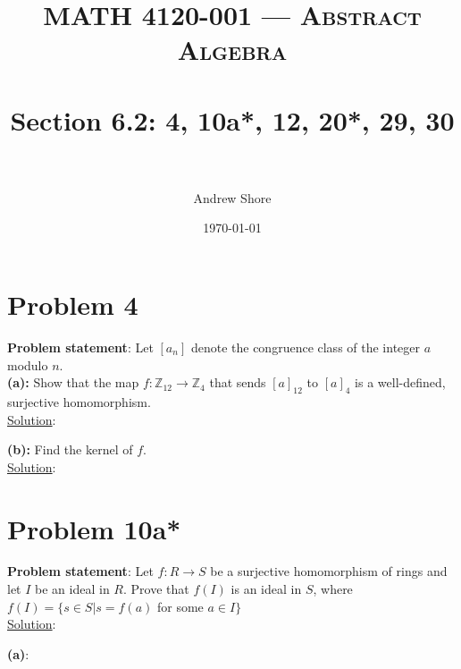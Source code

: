 \documentclass{article} %
\title{ 
\normalfont \normalsize 
\textsc{MATH 4120-001 --- Abstract Algebra} \\
\horrule{0.5pt} \\[0cm] %
\huge Section 6.2:  4, 10a*, 12, 20*, 29, 30\\ %
\horrule{2pt} \\[0cm] %
}
\author{Andrew Shore} %
\date{\normalsize\today} %
\begin{document}
\maketitle %

\section*{Problem 4}


\textbf{Problem statement}: Let $[a_n]$ denote the congruence class of the integer $a$ modulo $n$.
\\
\textbf{(a):} Show that the map $f: \mathbb{Z}_{12} \rightarrow \mathbb{Z}_4$ that sends $[a]_{12}$ to $[a]_4$ is a well-defined, surjective homomorphism.
\\
\underline{Solution}: 
\begin{addmargin}[1em]{0em}

\end{addmargin}


\textbf{(b):} Find the kernel of $f$.
\\
\underline{Solution}: 
\begin{addmargin}[1em]{0em}

\end{addmargin}    

\newpage

\section*{Problem 10a*}

\textbf{Problem statement}: Let $f: R \rightarrow S$ be a surjective homomorphism of rings and let $I$ be an ideal in $R$.  Prove that $f(I)$ is an ideal in $S$, where $f(I) = \{s \in S|s = f(a)$ for some $a \in I\}$
\\


\underline{Solution}: 
\begin{addmargin}[1em]{0em}
\textbf{(a)}:
\begin{addmargin}[1em]{0em}
\end{addmargin}
\end{addmargin}

\newpage
\end{document}
